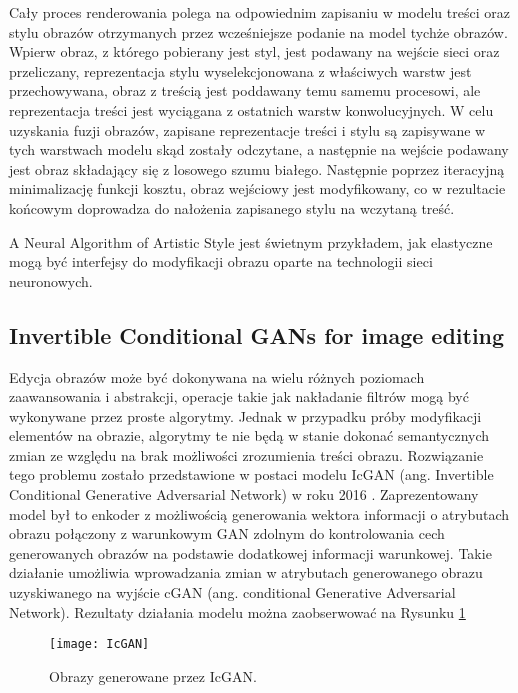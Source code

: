     Cały proces renderowania polega na odpowiednim zapisaniu w modelu treści
    oraz stylu obrazów otrzymanych przez wcześniejsze podanie na model tychże
    obrazów. Wpierw obraz, z którego pobierany jest styl, jest podawany na
    wejście sieci oraz przeliczany, reprezentacja stylu wyselekcjonowana z
    właściwych warstw jest przechowywana, obraz z treścią jest poddawany temu samemu
    procesowi, ale reprezentacja treści jest wyciągana z ostatnich
    warstw konwolucyjnych.
    W celu uzyskania fuzji obrazów, zapisane reprezentacje treści i stylu są
    zapisywane w tych warstwach modelu skąd zostały odczytane, a następnie na wejście
    podawany jest obraz składający się z losowego szumu białego.
    Następnie poprzez iteracyjną minimalizację funkcji kosztu, obraz wejściowy jest modyfikowany, co w rezultacie końcowym doprowadza do nałożenia zapisanego
    stylu na wczytaną treść.

    A Neural Algorithm of Artistic Style jest świetnym przykładem, jak elastyczne
    mogą być interfejsy do modyfikacji obrazu oparte na technologii sieci neuronowych.

  \subsection{Invertible Conditional GANs for image editing}
    Edycja obrazów może być dokonywana na wielu różnych poziomach zaawansowania
    i abstrakcji, operacje takie jak nakładanie filtrów mogą być
    wykonywane przez proste algorytmy. Jednak w przypadku próby modyfikacji
    elementów na obrazie, algorytmy te nie będą w stanie dokonać semantycznych
    zmian ze względu na brak możliwości zrozumienia treści obrazu. Rozwiązanie
    tego problemu zostało przedstawione w postaci modelu IcGAN
    (ang. Invertible Conditional Generative Adversarial Network) w roku 2016
    \cite{gan_editing}. Zaprezentowany model był to enkoder z możliwością
    generowania wektora informacji o atrybutach obrazu połączony z warunkowym
    GAN zdolnym do kontrolowania cech generowanych obrazów na podstawie dodatkowej
    informacji warunkowej. Takie działanie umożliwia wprowadzania zmian w
    atrybutach generowanego obrazu uzyskiwanego na wyjście cGAN (ang. conditional Generative
    Adversarial Network). Rezultaty działania modelu można zaobserwować na
    Rysunku \ref{fig:IcGAN}

    \begin{figure}[ht]
      \centering
      \texttt{[image: IcGAN]}
      \caption[Obrazy generowane przez IcGAN - źródło: \cite{gan_editing}]{Obrazy generowane przez IcGAN.}
      \label{fig:IcGAN}
    \end{figure}

